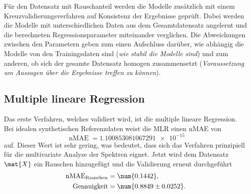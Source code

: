 Für den Datensatz mit Rauschanteil werden die Modelle zusätzlich mit einem Kreuzvalidierungsverfahren auf Konsistenz der Ergebnisse geprüft.
Dabei werden die Modelle mit unterschiedlichen Daten aus dem Gesamtdatensatz angelernt und die berechneten Regressionsparameter miteinander verglichen.
Die Abweichungen zwischen den Parametern geben zum einen Aufschluss darüber, wie abhängig die Modelle von den Trainingsdaten sind (\emph{wie stabil die Modelle sind}) und zum anderen, ob sich der gesamte Datensatz homogen zusammensetzt (\emph{Voraussetzung um Aussagen über die Ergebnisse treffen zu können}). 







\subsection{Multiple lineare Regression}
Das erste Verfahren, welches validiert wird, ist die multiple lineare Regression.
Bei idealen synthetischen Referenzdaten weist die \gls{MLR} einen \gls{nMAE} von 
\begin{equation*}
  \operatorname{nMAE} = \num{1.100853081067291e-15}
\end{equation*}
auf.
Dieser Wert ist sehr gering, was bedeutet, dass sich das Verfahren prinzipiell für die multivariate Analyse der Spektren eignet.
Jetzt wird dem Datensatz $\mat{X}$ ein Rauschen hinzugefügt und die Validierung erneut durchgeführt
\begin{align*}
  \operatorname{nMAE}_\mathrm{Rauschen} &= \num{0.1442}, \\
  \operatorname{Genauigkeit} &= \num{0.8849 \pm 0.0252}.
\end{align*}

